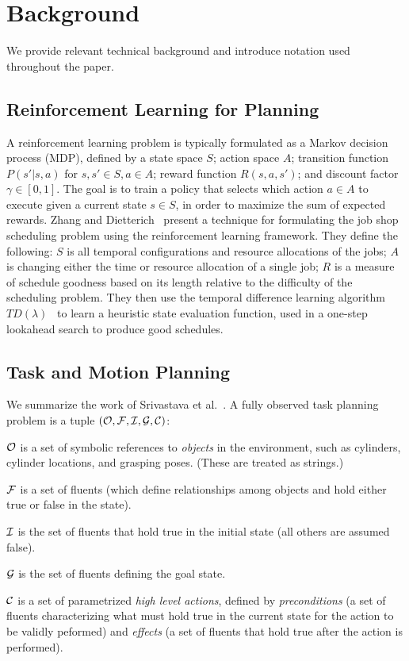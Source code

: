\section{Background}
We provide relevant technical background and introduce notation
used throughout the paper.
\subsection{Reinforcement Learning for Planning}
A reinforcement learning problem is typically formulated as
a Markov decision process (MDP), defined by a state space
$S$; action space $A$; transition function $P(s' | s, a)$ for $s, s' \in S, a \in A$;
reward function $R(s, a, s')$; and discount factor $\gamma \in [0, 1]$. The goal
is to train a policy that selects which action $a \in A$ to execute given a current
state $s \in S$, in order to maximize the sum of expected rewards. Zhang
and Dietterich~\cite{JobShopSched} present a technique for formulating the job shop scheduling
problem using the reinforcement learning framework. They define the following:
$S$ is all temporal configurations and resource allocations of the jobs; $A$ is changing
either the time or resource allocation of a single job; $R$ is a measure of schedule
goodness based on its length relative to the difficulty of the scheduling problem.
They then use the temporal difference learning algorithm $TD(\lambda)$~\cite{suttonbarto}
to learn a heuristic state evaluation function, used in a one-step lookahead search
to produce good schedules.
\subsection{Task and Motion Planning}
We summarize the work of Srivastava et al.~\cite{srivastava2014combined}. A fully observed task planning
problem is a tuple $(\mathcal{O}, \mathcal{F}, \mathcal{I}, \mathcal{G}, \mathcal{C})$:

$\mathcal{O}$ is a set of symbolic references to \emph{objects} in the environment,
such as cylinders, cylinder locations, and grasping poses. (These are treated as strings.)

$\mathcal{F}$ is a set of fluents (which define relationships among objects and hold either
true or false in the state).

$\mathcal{I}$ is the set of fluents that hold true in the initial state
(all others are assumed false).

$\mathcal{G}$ is the set of fluents defining the goal state.

$\mathcal{C}$ is a set of parametrized \emph{high level actions}, defined by \emph{preconditions} (a set
of fluents characterizing what must hold true in the current state for the action
to be validly peformed) and \emph{effects} (a set of fluents that hold true after
the action is performed).


